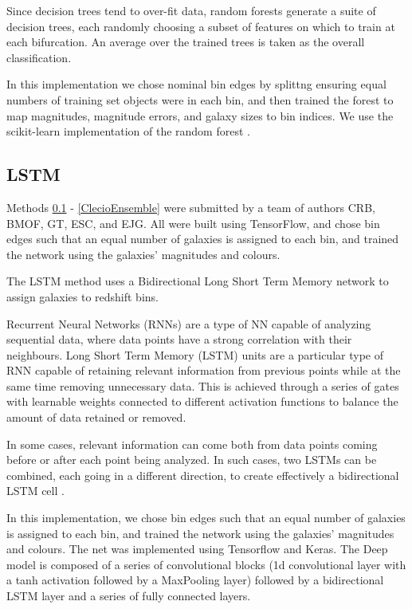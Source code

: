 \documentclass[twocolumn,twocolappendix]{aastex63}
\begin{document}
Since decision trees tend to over-fit data, random forests generate a suite of decision
trees, each randomly choosing a subset of features on which to train at each bifurcation.
An average over the trained trees is taken as the overall classification.

In this implementation we chose nominal bin edges by splittng ensuring equal numbers of training set 
objects were in each bin, and then trained the forest to map magnitudes, magnitude errors, and
galaxy sizes to bin indices.  We use the {\sc scikit-learn} implementation of the random forest
\citep{scikit-learn}.



\subsection{ {\sc LSTM} } 
\label{ClecioLSTM} 
Methods \ref{ClecioLSTM} - \ref{ClecioEnsemble} were
submitted by a team of authors CRB, BMOF, GT, ESC, and EJG.  All were built using TensorFlow, and
chose bin edges such that an equal number of galaxies is assigned to each bin, and trained the
network using the galaxies' magnitudes and colours. 

The LSTM method uses a Bidirectional Long Short Term Memory network to assign galaxies to redshift
bins.
 
Recurrent Neural Networks (RNNs)\citep{schuster, medsker, pascanu} are a type of NN capable of
analyzing sequential data, where data points have a strong correlation with their neighbours. Long
Short Term Memory (LSTM) units are a particular type of RNN capable of retaining relevant
information from previous points while at the same time removing unnecessary data. This is achieved
through a series of gates with learnable weights connected to different activation functions to
balance the amount of data retained or removed.
 
In some cases, relevant information can come both from data points coming before or after each point
being analyzed. In such cases, two LSTMs can be combined, each going in a different direction, to
create effectively a bidirectional LSTM cell \citep{schuster}.
 
In this implementation, we chose bin edges such that an equal number of galaxies is assigned to each
bin, and trained the network using the galaxies' magnitudes and colours. The net was implemented
using Tensorflow and Keras. The Deep model is composed of a series of convolutional blocks (1d
convolutional layer with a tanh activation followed by a MaxPooling layer) followed by a
bidirectional LSTM layer and a series of fully connected layers. 
\end{document}
